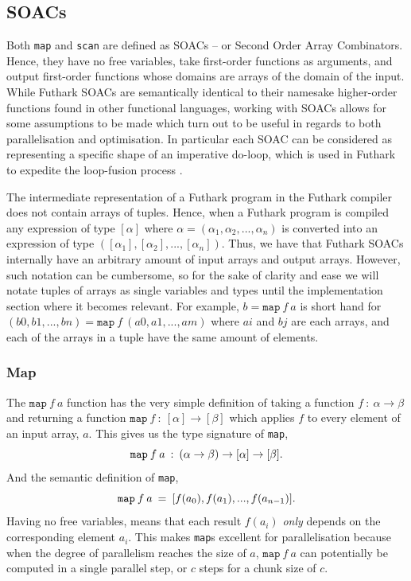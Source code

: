 \documentclass[11pt,bibliography=totocnumbered]{article}
\begin{document}
\subsection{SOACs}
Both \texttt{map} and \texttt{scan} are defined as SOACs -- or Second Order Array Combinators. Hence, they have no free variables, take first-order functions as arguments, and output first-order
 functions whose domains are arrays of the domain of the input.
While Futhark SOACs are semantically identical to their namesake higher-order functions found in other functional languages, working with SOACs allows for some assumptions to be made
 which turn out to be useful in regards to both parallelisation and optimisation. In particular each SOAC can be considered as representing a specific shape of an imperative do-loop, which
 is used in Futhark to expedite the loop-fusion process \cite[chap. 7]{MasterTroels}.

The intermediate representation of a Futhark program in the Futhark compiler does not contain arrays of tuples. Hence, when a Futhark program is compiled any expression of type $[\alpha]$ where
 $\alpha =  (\alpha_1, \alpha_2, ..., \alpha_n)$ is converted into an expression of type $([\alpha_1], [\alpha_2],..., [\alpha_n])$. Thus, we have that Futhark SOACs internally have an arbitrary amount
 of input arrays and output arrays. However, such notation can be cumbersome, so for the sake of clarity and ease we will notate tuples of arrays as single variables and types until the implementation
 section where it becomes relevant.
 For example, $b = \mathtt{map} \: f \: a$ is short hand for $(b0, b1,..., bn) = \mathtt{map} \: f \: (a0, a1, ..., am)$ where $ai$ and $bj$ are each arrays, and each of the arrays
 in a tuple have the same amount of
 elements.
\subsubsection{Map}
The $\texttt{map} \: f \: a$ function has the very simple definition of taking a function $f \: : \: \alpha \to \beta$ and returning a function $\mathtt{map} \:f \: : \: [\alpha] \to [\beta]$  which
 applies $f$ to every element of an input array, $a$.  This gives us the type signature of \texttt{map},
$$\mathtt{map} \: f \: a \: :  \: (\alpha \to \beta) \to [\alpha] \to [\beta]\mathnormal{.}$$
And the semantic definition of \texttt{map},
$$\mathtt{map} \: f \: a \: =  \: [f(a_0), f(a_1), ..., f(a_{n-1})]\mathnormal{.}$$
Having no free variables, means that each result $f(a_i)$ \textit{only} depends on the corresponding element $a_i$. This makes \texttt{map}s excellent for parallelisation because when the
 degree of parallelism reaches the size of $a$, $\mathtt{map} \: f \: a$ can potentially be computed in a single parallel step, or $c$ steps for a chunk size of $c$.
\end{document}

